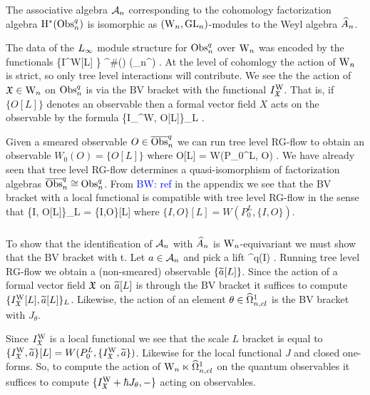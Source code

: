 \documentclass[10pt]{amsart}
\def\brian{\textcolor{blue}{BW: }\textcolor{blue}}
\def\hA{\Hat{A}}
\begin{document}
\begin{thm} The associative algebra $\cA_n$ corresponding to the
  cohomology factorization algebra ${\rm H}^*(\Obs^q_n)$ is isomorphic
  as $(\Vect, \GL_n)$-modules to the Weyl algebra $\hA_n$. 
\end{thm}

The data of the $\L8$ module structure for $\Obs^q_n$ over $\Vect$ was
encoded by the functionals 
\ben
\{I^{\rm W}[L] \} \subset \clie^\#(\Vect) \tensor \clie(\DD \fg_n^\RR) \ll
\hbar \rr .
\een 
At the level of cohomlogy the action of $\Vect$ is strict, so only
tree level interactions will contribute. We
see the the action of $\fX \in \Vect$ on $\Obs^q_n$ is via the BV bracket
with the functional $I^{\rm W}_\fX$. That is, if $\{O[L]\}$ denotes an
observable then a formal vector field $X$ acts on the observable by
the formula
\ben
\{I_\fX^{\rm W}, O[L]\}_L .
\een 

Given a smeared observable $O \in \bObs^q_n$ we can run tree level
RG-flow to obtain an observable $W_0(O) = \{O[L]\}$ where
\ben
O[L] = W(P_0^L, O) .
\een
We have already seen that tree level RG-flow determines a
quasi-isomorphism of factorization algebras $\bObs^q_n \cong
\Obs^q_n$. From \brian{ref} in the appendix we see that the BV bracket with a
local functional is
compatible with tree level RG-flow in the sense that 
\ben
\{I, O[L]\}_L = \{I,O\}[L]
\een
where $\{I,O\} [L] = W(P_0^L, \{I,O\})$.

\subsubsection{}

To show that the identification of $\cA_n$ with $\hA_n$ is
$\Vect$-equivariant we must show that the BV bracket with t. Let $a \in \cA_n$ and pick
a lift 
\ben
{} \in \bObs^q(I) .
\een 
Running tree level RG-flow we obtain a (non-smeared) observable
$\{\Tilde{a}[L]\}$. Since the action of a formal vector field $\fX$ on
$\Tilde{a}[L]$ is through the BV bracket it suffices to compute
$\{I^{\rm W}_\fX [L] , \Tilde{a}[L]\}_L$. Likewise, the action of an element
$\theta \in \hOmega^1_{n,cl}$ is the BV bracket with $J_\theta$.

Since $I_\fX^{\rm W}$ is a local functional we see that the scale $L$
bracket is equal
to $\{I_\fX^{\rm W}, \Tilde{a}\}[L] = W(P_0^L, \{I_\fX^{\rm W},
\Tilde{a}\})$. Likewise for the local functional $J$ and closed
one-forms. So, to compute the action of $\Vect \ltimes \hOmega^1_{n,cl}$ on the
quantum observables it suffices to compute $\{I_\fX^{\rm W} + \hbar
J_\theta , -\}$ acting on observables.
\end{document}
